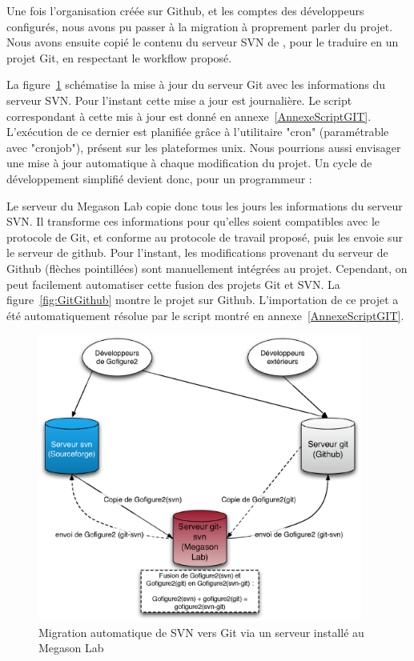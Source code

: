 Une fois l'organisation {\gofigure} créée sur Github, et les comptes des développeurs configurés, nous avons pu passer à la migration à proprement parler du projet.
Nous avons ensuite copié le contenu du serveur SVN de {\gofigure},
pour le traduire en un projet Git, en respectant le workflow proposé.

La figure~\ref{fig:MigrationGit} schématise la mise à jour du serveur Git avec les informations du serveur SVN.
Pour l'instant cette mise a jour est journalière. Le script correspondant à cette mis à jour est donné en annexe~\ref{AnnexeScriptGIT}. L'exécution de ce dernier est planifiée grâce à l'utilitaire "cron" (paramétrable avec "cronjob"), présent sur les plateformes unix.
Nous pourrions aussi envisager une mise à jour automatique à chaque modification du projet.
Un cycle de développement simplifié devient donc, pour un programmeur :

Le serveur du Megason Lab copie donc tous les jours les informations du serveur SVN.
Il transforme ces informations pour qu'elles soient compatibles avec le protocole de Git,
et conforme au protocole de travail proposé, puis les envoie sur le serveur de github.
Pour l'instant, les modifications provenant du serveur de Github (flèches pointillées)
sont manuellement intégrées au projet. Cependant, on peut facilement automatiser cette fusion des projets Git et SVN.
La figure~\ref{fig:GitGithub} montre le projet {\gofigure} sur Github. L'importation de ce projet a été automatiquement résolue par le script montré en annexe~\ref{AnnexeScriptGIT}.

\begin{figure}[h]
\begin{center}
\leavevmode
\includegraphics[width=0.95\textwidth]{pictures/GitTransfert}
\end{center}
\caption{Migration automatique de SVN vers Git via un serveur installé au Megason Lab}
\label{fig:MigrationGit}
\end{figure}

